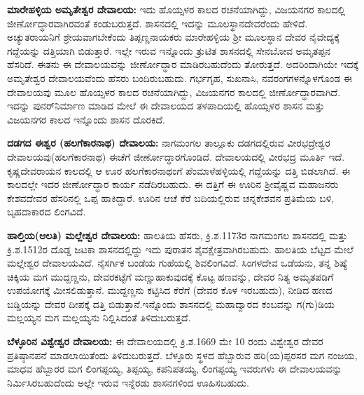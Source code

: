 \textbf{ಮಾರೇಹಳ್ಳಿಯ ಅಮೃತೇಶ್ವರ ದೇವಾಲಯ:} ಇದು ಹೊಯ್ಸಳರ ಕಾಲದ ರಚನೆಯಾಗಿದ್ದು, ವಿಜಯನಗರ ಕಾಲದಲ್ಲಿ ಜೀರ್ಣೋದ್ಧಾರವಾಗಿರವಂತೆ ಕಂಡುಬರುತ್ತದೆ. ಶಾಸನದಲ್ಲಿ ಇದನ್ನು ಮೂಲಸ್ಥಾನದೇವರೆಂದು ಹೇಳಿದೆ. ಅಚ್ಯುತರಾಯನಿಗೆ ಶ್ರೇಯವಾಗಬೇಕೆಂದು ತಿಪ್ಪಣ್ಣನಾಯಕರು ಮಾರೇಹಳ್ಳಿಯ ಶ‍್ರೀ ಮೂಲಸ್ಥಾನ ದೇವರ ನೈವೇದ್ಯಕ್ಕೆ ಗದ್ದೆಯನ್ನು ದತ್ತಿಯಾಗಿ ಬಿಡುತ್ತಾರೆ. ಇಲ್ಲೇ ಇರುವ ಇನ್ನೊಂದು ತ್ರುಟಿತ ಶಾಸನದಲ್ಲಿ ಸೇನಬೋವ ಅಮೃತಪ್ಪನ ಹೆಸರಿದೆ. ಈತನು ಈ ದೇವಾಲಯವನ್ನು ಜೀರ್ಣೋದ್ಧಾರ ಮಾಡಿರಬಹುದೆಂದು ತೋರುತ್ತದೆ. ಅದರಿಂದಾಗಿಯೇ ಇದಕ್ಕೆ ಅಮೃತೇಶ್ವರ ದೇವಾಲಯವೆಂದು ಹೆಸರು ಬಂದಿರುಬಹುದು. ಗರ್ಭಗೃಹ, ಸುಖನಾಸಿ, ನವರಂಗಗಳನ್ನೊಳಗೊಂಡ ಈ ದೇವಾಲಯವು ಮೂಲ ಹೊಯ್ಸಳರ ಕಾಲದ ರಚನೆಯಾಗಿದ್ದು, ವಿಜಯನಗರ ಕಾಲದಲ್ಲಿ ಜೀರ್ಣೋದ್ಧಾರವಾಗಿದೆ. ಇದನ್ನು ಪುನರ್​ನಿರ್ಮಾಣ ಮಾಡಿದ ಮೇಲೆ ಈ ದೇವಾಲಯದ ತಳಪಾದಿಯಲ್ಲಿ ಹೊಯ್ಸಳರ ಶಾಸನ ಮತ್ತು ವಿಜಯನಗರ ಕಾಲದ ಇನ್ನೊಂದು ಶಾಸನ ದೊರಕಿದೆ. 

\textbf{ದಡಗದ ಈಶ್ವರ (ಹಲಗೆಕಾರನಾಥ) ದೇವಾಲಯ: } ನಾಗಮಂಗಲ ತಾಲ್ಲೂಕು ದಡಗದಲ್ಲಿರುವ ವೀರಭದ್ರೇಶ್ವರ ದೇವಾಲಯವು(ಹಲಗೆಕಾರನಾಥ) ಈಚೆಗೆ ಜೀರ್ಣೋದ್ಧಾರಗೊಂಡಿದೆ. ದೇವಾಲಯದಲ್ಲಿ ವೀರಭದ್ರ ಮೂರ್ತಿ ಇದೆ. ಕೃಷ್ಣದೇವರಾಯನ ಕಾಲದಲ್ಲಿ ಆ ಊರ ಹಲಗೆಕಾರನಾಥಂಗೆ ಪೆಂಮಾಳೆಹಳ್ಳಿಯಲ್ಲಿ ಗದ್ದೆಯನ್ನು ದತ್ತಿ ಬಿಡಲಾಗಿದೆ. ಈ ಕಾಲದಲ್ಲೇ ಇದರ ಜೀರ್ಣೋದ್ಧಾರ ಕಾರ್ಯ ನಡೆದಿರಬಹುದು. ಈ ದತ್ತಿಗೆ ಈ ಊರಿನ ಶ‍್ರೀವೈಷ್ಣವ ಮಹಾಜನರು ಕೇಶವದೇವರ ಹೆಸರಿನಲ್ಲಿ ಒಪ್ಪ ಹಾಕಿದ್ದಾರೆ. ಊರಿನ ಆಚೆ ಕೆರೆ ಬದಿಯಲ್ಲಿರುವ ಚನ್ನಕೇಶವನ ಪ್ರತಿಮೆಯ ಬಳಿ, ಬೃಹದಾಕಾರದ ಲಿಂಗವಿದೆ.

\textbf{ಹಾಲ್ತಿಯ(ಆಲತಿ) ಮಲ್ಲೇಶ್ವರ ದೇವಾಲಯ:} ಹಾಲತಿಯ ಹೆಸರು, ಕ್ರಿ.ಶ.1173ರ ನಾಗಮಂಗಲ ಶಾಸನದಲ್ಲಿ ಮತ್ತು ಕ್ರಿ.ಶ.1512ರ ದೊಡ್ಡ ಜಟಕಾ ಶಾಸನದಲ್ಲಿದ್ದು ಇದು ಪುರಾತನ ಶೈವಕ್ಷೇತ್ರವಾಗಿರಬಹುದು. ಹಾಲತಿಯ ಬೆಟ್ಟದ ಮೇಲೆ ಮಲ್ಲೇಶ್ವರ ದೇವಾಲಯವಿದೆ. ನೈಸರ್ಗಿಕ ಬಂಡೆಯ ಗುಹೆಯಲ್ಲಿ ಶಿವಲಿಂಗವಿದೆ. ಸಿಂಗಳದೇವ ಒಡೆಯನು, ತನ್ನ ಶಿಷ್ಯೆ ಚಿಕ್ಕಿಯ ಮಗ ಮುದ್ದಣ್ಣನು, ದೇವರಕಟ್ಟೆಗೆ ಮಣ್ಣುಹಾಕುವುದಕ್ಕೆ ಕೊಟ್ಟ ಹಣವನ್ನು, ದೇವರ ನಿತ್ಯ ಅಮೃತಪಡಿಗೆ ಉಪಯೋಗಕ್ಕೆ ಮೀಸಲಿಡುತ್ತಾನೆ. ಮುದ್ದಣ್ಣನು ಕಟ್ಟಿಸಿದ ಕೆರೆಗೆ (ದೇವರ ಕೊಳ ಇರಬಹುದು), ನೀಡಿದ ಹಣದ ಬಡ್ಡಿಯನ್ನು ದೇವರ ದೀಪಕ್ಕೆ ದತ್ತಿ ಬಿಡುತ್ತಾನೆ.ಇನ್ನೊಂದು ಶಾಸನದಲ್ಲಿ ಮಹಾದ್ವಾರದ ಕಂಬವನ್ನು ಗ(ಗು)ಡಿಯ ಮಲ್ಲಯ್ಯನ ಮಗ ಮಲ್ಲಯ್ಯನು ನಿಲ್ಲಿಸಿದಂತೆ ತಿಳಿದುಬರುತ್ತದೆ.

\textbf{ಬೆಳ್ಳೂರಿನ ವಿಶ್ವೇಶ್ವರ ದೇವಾಲಯ:} ಈ ದೇವಾಲಯದಲ್ಲಿ ಕ್ರಿ.ಶ.1669 ಮೇ 10 ರಂದು ವಿಶ್ವೇಶ್ವರ ದೇವರ ಪ್ರತಿಷ್ಠಾನಪನೆ ಮಾಡಲಾಯಿತೆಂದು ತಿಳಿದುಬರುತ್ತದೆ. ಬೆಳ್ಳೂರು ಸ್ಥಳದ ಹೆಬ್ಬಾರುವ ಹರಿ(ಯ)ಪ್ಪರಸರ ಮಗ ನಂಜಯ, ಮಾಧವ ಹೆಬ್ಬಾರರ ಮಗ ಲಿಂಗಪ್ಪಯ್ಯ, ತಿಪ್ಪಯ್ಯ, ಕಪನಿಪತಯ್ಯ, ಲಿಂಗಪ್ಪಯ್ಯ ಇವರುಗಳು ಈ ದೇವಾಲಯವನ್ನು ನಿರ್ಮಿಸಿರಬಹುದೆಂದು ಅಲ್ಲೇ ಇರುವ ಇನ್ನೆರಡು ಶಾಸನಗಳಿಂದ ಊಹಿಸಬಹುದು.

